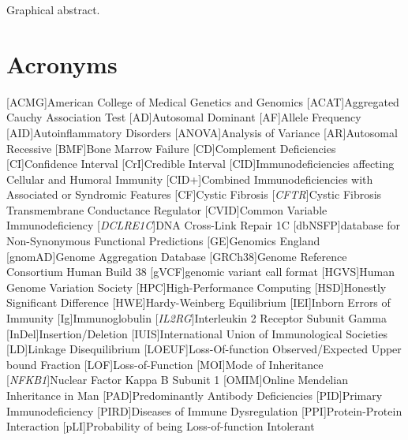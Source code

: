 Graphical abstract.

\clearpage


\section*{Acronyms}
\renewenvironment{description}%
  {\list{}{\labelwidth0pt\itemindent-\leftmargin
    \parsep-.5em\itemsep0pt\let\makelabel\descriptionlabel}}
  {\endlist}
\begin{acronym}
[ACMG]{American College of Medical Genetics and Genomics}%
[ACAT]{Aggregated Cauchy Association Test}%
[AD]{Autosomal Dominant}%
  [AF]{Allele Frequency}
 [AID]{Autoinflammatory Disorders}
 [ANOVA]{Analysis of Variance}
 [AR]{Autosomal Recessive}
 [BMF]{Bone Marrow Failure}
 [CD]{Complement Deficiencies}
 [CI]{Confidence Interval}
 [CrI]{Credible Interval}
 [CID]{Immunodeficiencies affecting Cellular and Humoral Immunity}
 [CID+]{Combined Immunodeficiencies with Associated or Syndromic Features}
 [CF]{Cystic Fibrosis}
 [\textit{CFTR}]{Cystic Fibrosis Transmembrane Conductance Regulator}
 [CVID]{Common Variable Immunodeficiency}
  [\textit{DCLRE1C}]{DNA Cross-Link Repair 1C}
 [dbNSFP]{database for Non-Synonymous Functional Predictions}
 [GE]{Genomics England} 
 [gnomAD]{Genome Aggregation Database}
 [GRCh38]{Genome Reference Consortium Human Build 38}
[gVCF]{genomic variant call format}
 [HGVS]{Human Genome Variation Society}
 [HPC]{High-Performance Computing}
 [HSD]{Honestly Significant Difference}
 [HWE]{Hardy-Weinberg Equilibrium}
 [IEI]{Inborn Errors of Immunity}
  [Ig]{Immunoglobulin}
 [\textit{IL2RG}]{Interleukin 2 Receptor Subunit Gamma}
 [InDel]{Insertion/Deletion}
 [IUIS]{International Union of Immunological Societies}
 [LD]{Linkage Disequilibrium}
 [LOEUF]{Loss-Of-function Observed/Expected Upper bound Fraction}
 [LOF]{Loss-of-Function}
 [MOI]{Mode of Inheritance}
 [\textit{NFKB1}]{Nuclear Factor Kappa B Subunit 1}
 [OMIM]{Online Mendelian Inheritance in Man}
 [PAD]{Predominantly Antibody Deficiencies}
 [PID]{Primary Immunodeficiency}
 [PIRD]{Diseases of Immune Dysregulation}
 [PPI]{Protein-Protein Interaction}
 [pLI]{Probability of being Loss-of-function Intolerant}

\end{acronym}
